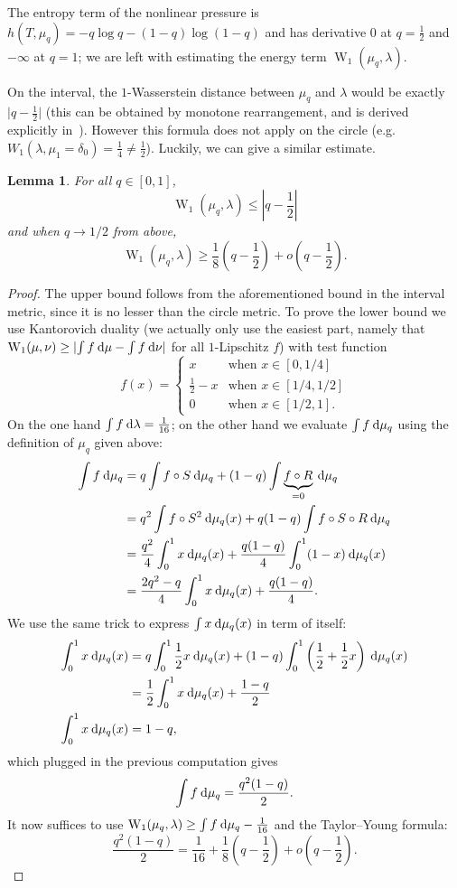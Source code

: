 \documentclass[10pt]{amsart}
\newtheorem{lemm}[theo]{Lemma}\newtheorem{prop}[theo]{Proposition}\newtheorem{coro}[theo]{Corollary}\newtheorem{conj}[theo]{Conjecture}
\theoremstyle{definition}\newtheorem{defi}[theo]{Definition}\newtheorem{rema}[theo]{Remark}\newtheorem{exam}[theo]{Example}\newtheorem{exem}[theo]{Example}\newtheorem{nota}[theo]{Notation}
\theoremstyle{plain}
\theoremstyle{plain}
\newcommand{\wass}{\operatorname{W}}
\newcommand*{\dd} {\relax\ifnum\lastnodetype>0\mskip\medmuskip\fi\mathrm{d}}
\newcommand*\8{\infty}
\begin{document}
The entropy term of the nonlinear pressure is $h(T,\mu_q)=-q\log q-(1-q)\log(1-q)$ and has derivative $0$ at $q=\frac12$ and $-\infty$ at $q=1$; we are left with estimating the energy term $\wass_1(\mu_q,\lambda)$.

On the interval, the $1$-Wasserstein distance between $\mu_q$ and $\lambda$ would be exactly $\lvert q-\frac12\rvert$ (this can be obtained by monotone rearrangement, and is derived explicitly in~\cite{Fraser2015}). However this formula does not apply on the circle (e.g. $W_1(\lambda,\mu_1=\delta_0)=\frac14\neq\frac12$). Luckily, we can give a similar estimate.

\begin{lemm}
For all $q\in[0,1]$,
\[
\wass_1(\mu_q,\lambda)\le \left\lvert q-\frac12 \right\rvert
\]
and when $q\to 1/2$ from above,
\[
\wass_1(\mu_q,\lambda) \ge \frac18\left(q-\frac12\right)+o\left(q-\frac12\right).
\]
\end{lemm}

\begin{proof}
The upper bound follows from the aforementioned bound in the interval metric, since it is no lesser than the circle metric. To prove the lower bound we use Kantorovich duality (we actually only use the easiest part, namely that $\wass_1(\mu,\nu) \ge \lvert\int f \dd \mu -\int f \dd \nu\lvert$ for all $1$-Lipschitz $f$) with test function
\[
f(x) =
\begin{cases}
x &\text{when }x\in[0,1/4] \\
\frac12-x &\text{when }x\in[1/4,1/2] \\
0 & \text{when }x\in [1/2,1].
\end{cases}
\]
On the one hand $\int f \dd\lambda = \frac{1}{16}$; on the other hand we evaluate $\int f\dd\mu_q$ using the definition of $\mu_q$ given above:
\begin{align*}
\int f\dd\mu_q &= q\int f\circ S \dd\mu_q + (1-q) \int \underbrace{f\circ R}_{=0}\dd\mu_q \\
&= q^2\int f\circ S^2 \dd\mu_q(x) + q(1-q) \int f\circ S\circ R \dd\mu_q \\
&= \frac{q^2}{4} \int_0^1 x \dd\mu_q(x) + \frac{q(1-q)}{4} \int_0^1 (1-x) \dd\mu_q(x) \\
&= \frac{2q^2-q}{4}\int_0^1 x\dd\mu_q(x) + \frac{q(1-q)}{4}.
\end{align*}
We use the same trick to express $\int x\dd\mu_q(x)$ in term of itself:
\begin{align*}
\int_0^1 x \dd\mu_q(x) &= q\int_0^1 \frac12 x \dd\mu_q(x) + (1-q)\int_0^1\left(\frac12+\frac12x\right)\dd\mu_q(x) \\
&= \frac{1}{2}\int_0^1 x \dd\mu_q(x)+\frac{1-q}{2}\\
\int_0^1 x \dd\mu_q(x) &= 1-q,
\end{align*}
which plugged in the previous computation gives
\[
\int f\dd\mu_q = \frac{q^2(1-q)}{2}.
\]
It now suffices to use $\wass_1(\mu_q,\lambda)\ge\int f\dd\mu_q-\frac{1}{16}$ and the Taylor--Young formula:
\[
\frac{q^2(1-q)}{2} = \frac{1}{16}+\frac18\left(q-\frac12\right) + o\left(q-\frac12\right).
\]
\end{proof}
\end{document}
